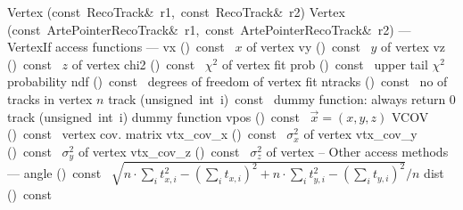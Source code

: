 \documentclass{article}
\begin{document}
\begin{cxxentry}
\begin{cxxclass}
\begin{cxxpublic}
        {}
        {}
\label{cxx.1.2.11}
\cxxitem{}
        {Vertex}
        {(const\ RecoTrack\&\ r1,\ const\ RecoTrack\&\ r2)}
        {}
        {}
\label{cxx.1.2.12}
\cxxitem{}
        {Vertex}
        {(const\ ArtePointer\<RecoTrack\>\&\ r1,\ const\ ArtePointer\<RecoTrack\>\&\ r2)}
        {}
        {}
\label{cxx.1.2.13}
\cxxitem{}
        {--- VertexIf access functions --- }
        {}
        {}
        {}
\label{cxx.1.2.14}
        {vx}
        {()\ const\ }
        { $x$ of vertex}
        {}
\label{cxx.1.2.15}
        {vy}
        {()\ const\ }
        { $y$ of vertex}
        {}
\label{cxx.1.2.16}
        {vz}
        {()\ const\ }
        { $z$ of vertex}
        {}
\label{cxx.1.2.17}
        {chi2}
        {()\ const\ }
        { $\chi^2$ of vertex fit}
        {}
\label{cxx.1.2.18}
        {prob}
        {()\ const\ }
        { upper tail $\chi^2$ probability}
        {}
\label{cxx.1.2.19}
        {ndf}
        {()\ const\ }
        { degrees of freedom of vertex fit}
        {}
\label{cxx.1.2.20}
        {ntracks}
        {()\ const\ }
        { no of tracks in vertex $n$}
        {}
\label{cxx.1.2.21}
        {track}
        {(unsigned\ int\ i)\ const\ }
        { dummy function: always return 0}
        {}
\label{cxx.1.2.22}
        {track}
        {(unsigned\ int\ i)}
        { dummy function}
        {}
\label{cxx.1.2.23}
        {vpos}
        {()\ const\ }
        { $\vec{x} = (x,y,z)$}
        {}
\label{cxx.1.2.24}
        {VCOV}
        {()\ const\ }
        { vertex cov. matrix}
        {}
\label{cxx.1.2.25}
        {vtx\_cov\_x}
        {()\ const\ }
        { $\sigma_x^2$ of vertex}
        {}
\label{cxx.1.2.26}
        {vtx\_cov\_y}
        {()\ const\ }
        { $\sigma_y^2$ of vertex}
        {}
\label{cxx.1.2.27}
        {vtx\_cov\_z}
        {()\ const\ }
        { $\sigma_z^2$ of vertex}
        {}
\label{cxx.1.2.28}
\cxxitem{}
        {-- Other access methods --- }
        {}
        {}
        {}
\label{cxx.1.2.29}
        {angle}
        {()\ const\ }
        {$\sqrt{n\cdot\sum_it_{x,i}^2 - (\sum_i t_{x,i})^2 + n\cdot\sum_i t_{y,i}^2 -
(\sum_i t_{y,i})^2} / n$ }
        {}
\label{cxx.1.2.30}
        {dist}
        {()\ const\ }

\end{cxxpublic}
\end{cxxclass}
\end{cxxentry}
\end{document}
